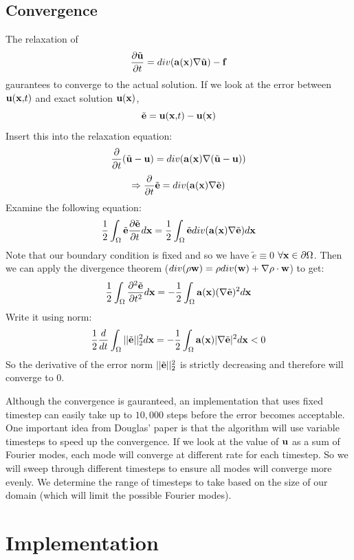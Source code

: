 \documentclass[a4paper,11pt]{article}
\begin{document}
\begin{multicols}{2}
	\subsection{Convergence}
	\par The relaxation of 
	\[\frac{\partial \tilde{\bf u}}{\partial t} = div({\bf a}({\bf x})\nabla\tilde{\bf u}) - {\bf f}\]
	gaurantees to converge to the actual solution. If we look at the error between ${\bf u(x,}t)$ and exact solution $\bf u(x)$, 
	\[\tilde{\bf e} = {\bf u(x,} t) - {\bf u(x)}\]
	Insert this into the relaxation equation:
	\[\frac{\partial }{\partial t}(\tilde{\bf u} - {\bf u}) = div({\bf a}({\bf x})\nabla(\tilde{\bf u}-{\bf u}))\]
	\[\Rightarrow \frac{\partial }{\partial t} {\tilde{\bf e}} = div({\bf a}({\bf x})\nabla\tilde{\bf e})\]
	Examine the following equation:
	\[\frac{1}{2}\int_{\Omega} \tilde{\bf e}\frac{\partial \tilde{\bf e}}{\partial t}d{\bf x} = \frac{1}{2}\int_{\Omega}\tilde{\bf e}div({\bf a}({\bf x})\nabla\tilde{\bf e})d{\bf x}\]
	Note that our boundary condition is fixed and so we have $\tilde{e} \equiv 0$ $\forall {\bf x} \in\partial\Omega$. Then we can apply the divergence theorem ($div(\rho{\bf w}) = \rho div({\bf w}) + \nabla \rho\cdot {\bf w}$) to get:
	\[\frac{1}{2}\int_{\Omega}\frac{\partial^2 \tilde{\bf e}}{\partial t^2}d{\bf x} = -\frac{1}{2}\int_{\Omega}{\bf a}({\bf x})(\nabla\tilde{\bf e})^2d{\bf x}\]
	Write it using norm:
	\[\frac{1}{2}\frac{d}{dt}\int_{\Omega}||\tilde{\bf e}||_2^2d{\bf x} = -\frac{1}{2}\int_{\Omega}{\bf a}({\bf x})|\nabla\tilde{\bf e}|^2d{\bf x} < 0\]
	So the derivative of the error norm $||\tilde{\bf e}||_2^2$ is strictly decreasing and therefore will converge to $0$.
	\par Although the convergence is gauranteed, an implementation that uses fixed timestep can easily take up to $10,000$ steps before the error becomes acceptable. One important idea from Douglas' paper is that the algorithm will use variable timesteps to speed up the convergence. If we look at the value of ${\bf u}$ as a sum of Fourier modes, each mode will converge at different rate for each timestep. So we will sweep through different timesteps to ensure all modes will converge more evenly. We determine the range of timesteps to take based on the size of our domain (which will limit the possible Fourier modes).
\section{Implementation}

\end{multicols}
\end{document}
